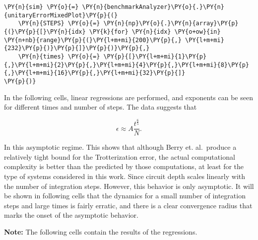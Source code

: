     \begin{tcolorbox}[breakable, size=fbox, boxrule=1pt, pad at break*=1mm,colback=cellbackground, colframe=cellborder]
\begin{Verbatim}[commandchars=\\\{\}]
\PY{n}{sim} \PY{o}{=} \PY{n}{benchmarkAnalyzer}\PY{o}{.}\PY{n}{unitaryErrorMixedPlot}\PY{p}{(}
    \PY{n}{STEPS} \PY{o}{=} \PY{n}{np}\PY{o}{.}\PY{n}{array}\PY{p}{(}\PY{p}{[}\PY{n}{idx} \PY{k}{for} \PY{n}{idx} \PY{o+ow}{in} \PY{n+nb}{range}\PY{p}{(}\PY{l+m+mi}{200}\PY{p}{,} \PY{l+m+mi}{232}\PY{p}{)}\PY{p}{]}\PY{p}{)}\PY{p}{,}
    \PY{n}{times} \PY{o}{=} \PY{p}{[}\PY{l+m+mi}{1}\PY{p}{,}\PY{l+m+mi}{2}\PY{p}{,}\PY{l+m+mi}{4}\PY{p}{,}\PY{l+m+mi}{8}\PY{p}{,}\PY{l+m+mi}{16}\PY{p}{,}\PY{l+m+mi}{32}\PY{p}{]}
\PY{p}{)}
\end{Verbatim}
\end{tcolorbox}

    In the following cells, linear regressions are performed, and exponents
can be seen for different times and number of steps. The data suggests
that

\[
\epsilon \approx A \frac{t^{\frac{6}{5}}}{N}.
\]

In this asymptotic regime. This shows that although Berry et.
al.~produce a relatively tight bound for the Trotterization error, the
actual computational complexity is better than the predicted by those
computations, at least for the type of systems considered in this work.
Since circuit depth scales linearly with the number of integration
steps. However, this behavior is only asymptotic. It will be shown in
following cells that the dynamics for a small number of integration
steps and large times is fairly erratic, and there is a clear
convergence radius that marks the onset of the asymptotic behavior.

\textbf{Note:} The following cells contain the results of the
regressions.

